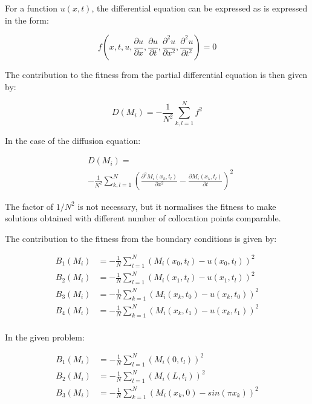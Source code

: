 \documentclass[multicolumn, 12pt]{extarticle}
\begin{document}
For a function $u(x, t)$, the differential equation can be expressed as is expressed in the form:

\begin{equation*}
	f \left( x, t, u, \frac{\partial u}{\partial x}, \frac{\partial u}{\partial t}, \frac{\partial^2 u }{\partial x^2}, \frac{\partial^2 u}{\partial t^2} \right) = 0
\end{equation*}


The contribution to the fitness from the partial differential equation is then given by:

\begin{equation*}
	D(M_{i}) = -\frac{1}{N^{2}}\sum_{k, l=1}^{N} f^2
\end{equation*}

In the case of the diffusion equation:

\begin{align*}
	 & D(M_{i}) =                                                                                                                                       \\
	 & - \frac{1}{N^{2}} \sum_{k, l=1}^{N} \left( \frac{\partial^2 M_i(x_k, t_l) }{\partial x^2} - \frac{\partial M_i(x_k, t_l)}{\partial t} \right) ^2
\end{align*}

The factor of $1/N^{2}$ is not necessary, but it normalises the fitness to make solutions obtained with different number of collocation points comparable.


The contribution to the fitness from the boundary conditions is given by:

\begin{align*}
	B_1(M_{i}) & = -\frac{1}{N} \sum_{l=1}^{N} \left( M_i(x_0, t_l)- u(x_0, t_l)\right) ^2 \\
	B_2(M_{i}) & = -\frac{1}{N} \sum_{l=1}^{N} (M_i(x_1, t_l)- u(x_1, t_l))^2              \\
	B_3(M_{i}) & = -\frac{1}{N} \sum_{k=1}^{N} (M_i(x_k, t_0)- u(x_k, t_0))^2              \\
	B_4(M_{i}) & = -\frac{1}{N} \sum_{k=1}^{N} (M_i(x_k, t_1)- u(x_k, t_1))^2              \\
\end{align*}

In the given problem:

\begin{align*}
	B_1(M_{i}) & = -\frac{1}{N} \sum_{l=1}^{N} \left( M_i(0, t_l)\right) ^2     \\
	B_2(M_{i}) & = -\frac{1}{N} \sum_{l=1}^{N} (M_i(L, t_l))^2                  \\
	B_3(M_{i}) & = -\frac{1}{N} \sum_{k=1}^{N} (M_i(x_k, 0) - sin(\pi x_{k}))^2 \\
\end{align*}
\end{document}
